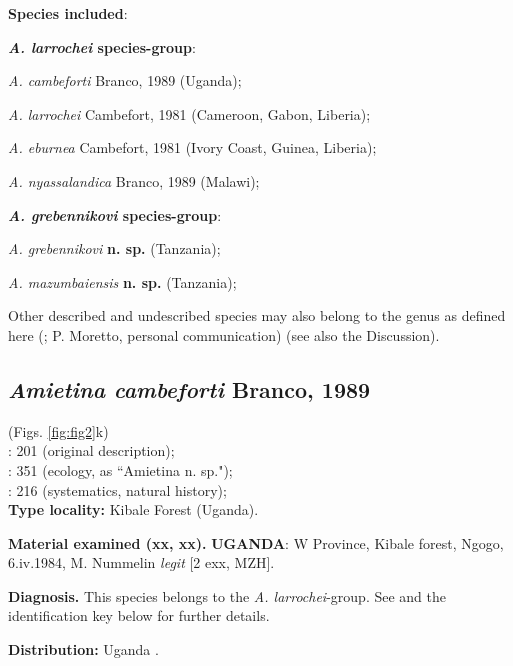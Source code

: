 \documentclass[fleqn,10pt,lineno]{wlpeerj}
\begin{document}
\textbf{Species included}:

\smallskip \noindent \textbf{\textit{A. larrochei} species-group}:

\indent \textit{A. cambeforti} Branco, 1989 (Uganda);

\indent \textit{A. larrochei} Cambefort, 1981 (Cameroon, Gabon, Liberia);

\indent \textit{A. eburnea} Cambefort, 1981 (Ivory Coast, Guinea, Liberia);

\indent \textit{A. nyassalandica} Branco, 1989 (Malawi);

\smallskip \noindent \textbf{\textit{A. grebennikovi} species-group}:

\indent \textit{A. grebennikovi} \textbf{n. sp.} (Tanzania);

\indent \textit{A. mazumbaiensis} \textbf{n. sp.} (Tanzania);

\smallskip

Other described and undescribed species may also belong to the genus as defined here (\citealp{moretto2010onthophagus}; P. Moretto, personal communication) (see also the Discussion).

\subsection*{\textbf{\textit{Amietina cambeforti} Branco, 1989}}
(Figs. \ref{fig:fig2}k)\\
\cite{branco1988deux}: 201 (original description);\\
\cite{nummelin1989dung}: 351 (ecology, as ``{Amietina} n. sp.");\\
\cite{davis2008african}: 216 (systematics, natural history);\\

\textbf{Type locality:} Kibale Forest (Uganda).

\textbf{Material examined (xx\male\male, xx\female\female).} \textbf{UGANDA}: W Province, Kibale forest, Ngogo, 6.iv.1984, M. Nummelin \textit{legit} [2 exx, MZH].

\textbf{Diagnosis.} This species belongs to the \textit{A. larrochei}-group. See \citep{branco1988deux} and the identification key below for further details.

\textbf{Distribution:} Uganda \citep{branco1988deux}.
\end{document}

